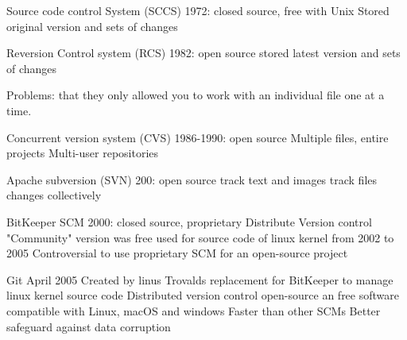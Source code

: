 Source code control System (SCCS)
  1972: closed source, free with Unix 
  Stored original version and sets of changes 

Reversion Control system (RCS)
  1982: open source 
  stored latest version and sets of changes 

Problems:
  that they only allowed you to work with an individual file one at a time.

Concurrent version system (CVS)
  1986-1990: open source 
  Multiple files, entire projects
  Multi-user repositories

Apache subversion (SVN)
  200: open source 
  track text and images 
  track files changes collectively 

BitKeeper SCM 
  2000: closed source, proprietary 
  Distribute Version control 
  "Community" version was free
  used for source code of linux kernel from 2002 to 2005
  Controversial to use proprietary SCM for an open-source project 

Git 
  April 2005 
  Created by linus Trovalds
  replacement for BitKeeper to manage linux kernel source code 
  Distributed version control 
  open-source an free software 
  compatible with Linux, macOS and windows
  Faster than other SCMs 
  Better safeguard against data corruption 
